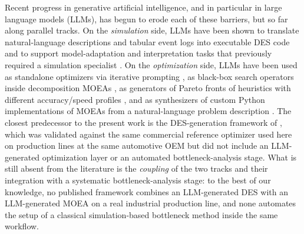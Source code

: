 \documentclass[a4paper,fleqn]{cas-sc}
\begin{document}
Recent progress in generative artificial intelligence, and in particular in large language models (LLMs), has begun to erode each of these barriers, but so far along parallel tracks. On the \emph{simulation} side, LLMs have been shown to translate natural-language descriptions and tabular event logs into executable DES code and to support model-adaptation and interpretation tasks    that previously required a simulation specialist \citep{Jackson2024,Elbasheer2025,Schmitt2026jms}. On the \emph{optimization} side, LLMs have been used as standalone optimizers via iterative prompting \citep{Yang2024opro}, as black-box search operators inside decomposition MOEAs   \citep{Liu2024llm4moea,Liu2024lowcost}, as generators of Pareto fronts of heuristics with different accuracy/speed profiles \citep{Yao2025meoh}, and as synthesizers of custom Python implementations of MOEAs from a natural-language problem description \citep{Huang2025tevc,Zhang2026survey}. The closest predecessor to the present work is the DES-generation framework of  \citet{Schmitt2026jms}, which was validated against the same commercial reference optimizer used here on production lines at the same automotive OEM but did not include an LLM-generated optimization layer or an automated bottleneck-analysis stage. What is still absent from the literature is the \emph{coupling} of the two tracks and their integration with a systematic bottleneck-analysis stage: to the best of our knowledge, no published framework combines an  LLM-generated DES with an LLM-generated MOEA on a real industrial production line, and none automates the setup of a classical simulation-based bottleneck method inside the same workflow.  
\end{document}
